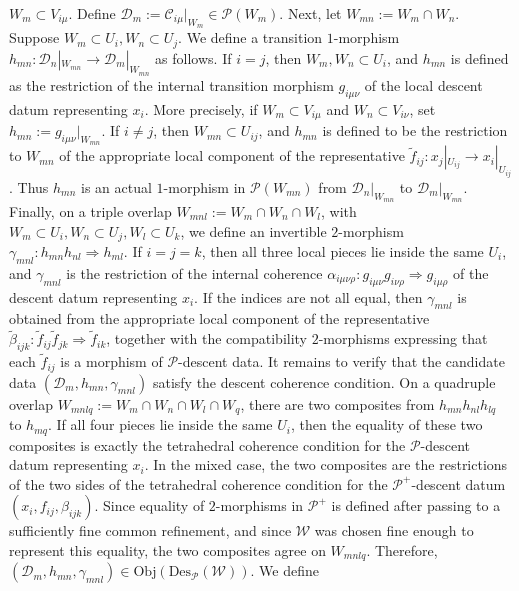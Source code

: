 \documentclass[reqno]{amsart}
\theoremstyle{definition}
\theoremstyle{remark}
\begin{document}
$W_m\subset V_{i\mu}$. Define $\mathcal D_m:=\mathcal C_{i\mu}|_{W_m}\in \mathscr P(W_m)$. Next, let $W_{mn}:=W_m\cap W_n$. Suppose $W_m\subset U_i, W_n\subset U_j$. We define a transition $1$-morphism $h_{mn}:\mathcal D_n|_{W_{mn}}\longrightarrow\mathcal D_m|_{W_{mn}} $ as follows. If $i=j$, then $W_m,W_n\subset U_i$, and $h_{mn}$ is defined as the restriction of the internal transition morphism $g_{i\mu\nu}$ of the local descent datum representing $x_i$. More precisely, if $W_m\subset V_{i\mu}$ and $W_n\subset V_{i\nu}$, set $h_{mn}:=g_{i\mu\nu}|_{W_{mn}}$. If $i\neq j$, then $W_{mn}\subset U_{ij}$, and $h_{mn}$ is defined to be the restriction to $W_{mn}$ of the appropriate local component of the representative $\widetilde f_{ij}:x_j|_{U_{ij}}\longrightarrow x_i|_{U_{ij}}$. Thus $h_{mn}$ is an actual $1$-morphism in $\mathscr P(W_{mn})$ from $\mathcal D_n|_{W_{mn}}$ to $\mathcal D_m|_{W_{mn}}$. Finally, on a triple overlap $W_{mnl}:=W_m\cap W_n\cap W_l$, with $W_m\subset U_i, W_n\subset U_j, W_l\subset U_k$, we define an invertible $2$-morphism $\gamma_{mnl}:h_{mn}h_{nl}\Longrightarrow h_{ml}$. If $i=j=k$, then all three local pieces lie inside the same $U_i$, and $\gamma_{mnl}$ is the restriction of the internal coherence $\alpha_{i\mu\nu\rho}:g_{i\mu\nu}g_{i\nu\rho}\Longrightarrow g_{i\mu\rho}$ of the descent datum representing $x_i$. If the indices are not all equal, then $\gamma_{mnl}$ is obtained from the appropriate local component of the representative $\widetilde\beta_{ijk}:\widetilde f_{ij}\widetilde f_{jk}\Longrightarrow\widetilde f_{ik}$, together with the compatibility $2$-morphisms expressing that each $\widetilde f_{ij}$ is a morphism of $\mathscr P$-descent data. It remains to verify that the candidate data $(\mathcal D_m,h_{mn},\gamma_{mnl})$ satisfy the descent coherence condition. On a quadruple overlap $W_{mnlq}:=W_m\cap W_n\cap W_l\cap W_q$, there are two composites from $h_{mn}h_{nl}h_{lq}$ to $h_{mq}$. If all four pieces lie inside the same $U_i$, then the equality of these two composites is exactly the tetrahedral coherence condition for the $\mathscr P$-descent datum representing $x_i$. In the mixed case, the two composites are the restrictions of the two sides of the tetrahedral coherence condition for the $\mathscr P^+$-descent datum $(x_i,f_{ij},\beta_{ijk})$. Since equality of $2$-morphisms in $\mathscr P^+$ is defined after passing to a sufficiently fine common refinement, and since $\mathcal{W}$ was chosen fine enough to represent this equality, the two composites agree on $W_{mnlq}$. Therefore, $(\mathcal D_m,h_{mn},\gamma_{mnl})\in \text{Obj}(\text{Des}_{\mathscr P}(\mathcal{W}))$. We define
\end{document}
